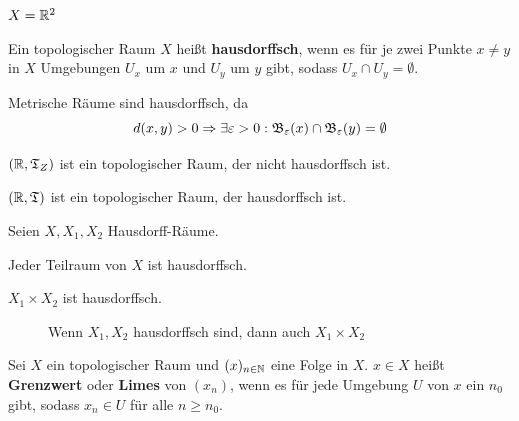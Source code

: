 \begin{beispiel}
    $X = \mathbb{R}^2$ 

    
\end{beispiel}

\begin{definition}%
    Ein topologischer Raum $X$ heißt \textbf{hausdorffsch}, wenn es
    für je zwei Punkte $x \neq y$ in $X$ Umgebungen $U_x$ um $x$
    und $U_y$ um $y$ gibt, sodass $U_x \cap U_y = \emptyset$.
\end{definition}

\begin{bemerkung}[Trennungseigenschaft]\label{Trennungseigenschaft}
    Metrische Räume sind hausdorffsch, da 
    \[d(x,y) > 0 \Rightarrow \exists \varepsilon > 0: \mathfrak{B}_\varepsilon(x) \cap \mathfrak{B}_\varepsilon(y) = \emptyset\]
\end{bemerkung}

\begin{beispiel}
    \begin{bspenum}
        \item $(\mathbb{R}, \mathfrak{T}_Z)$ ist ein topologischer Raum, der nicht hausdorffsch ist.
        \item $(\mathbb{R}, \mathfrak{T})$ ist ein topologischer Raum, der hausdorffsch ist.
    \end{bspenum}
\end{beispiel}

\begin{bemerkung}
    Seien $X, X_1, X_2$ Hausdorff-Räume.
    \begin{bemenum}
        \item Jeder Teilraum von $X$ ist hausdorffsch.
        \item $X_1 \times X_2$ ist hausdorffsch.
    \end{bemenum}
    \begin{figure}[htp]
        \centering
        
        \caption{Wenn $X_1, X_2$ hausdorffsch sind, dann auch $X_1 \times X_2$}
    \end{figure}
\end{bemerkung}

\begin{definition}%
    Sei $X$ ein topologischer Raum und $(x)_{n \in \mathbb{N}}$ eine Folge
    in $X$. $x \in X$ heißt \textbf{Grenzwert} oder \textbf{Limes}
    von $(x_n)$, wenn es für jede Umgebung $U$ von $x$ ein $n_0$ gibt,
    sodass $x_n \in U$ für alle $n \geq n_0$.
\end{definition}

